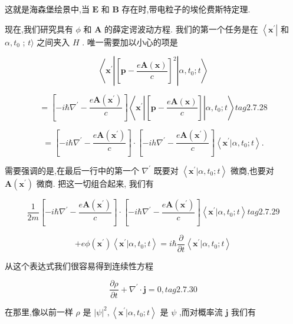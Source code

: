 \documentclass[lang=cn,newtx,10pt,scheme=chinese,thmcnt=section]{elegantbook}
\begin{document}
这就是海森堡绘景中,当 $\mathbf{E}$ 和 $\mathbf{B}$ 存在时,带电粒子的埃伦费斯特定理.

现在,我们研究具有 $\phi$ 和 $\mathbf{A}$ 的薛定谔波动方程. 我们的第一个任务是在 $\left\langle {\mathbf{x}}^{\prime }\right|$ 和 $\alpha ,{t}_{0}$ ; $t\rangle$ 之间夹入 $H$ . 唯一需要加以小心的项是

$$
\left\langle {{\mathbf{x}}^{\prime }\left| {\left\lbrack \mathbf{p} - \frac{e\mathbf{A}\left( \mathbf{x}\right) }{c}\right\rbrack }^{2}\right| \alpha ,{t}_{0};t}\right\rangle
$$

$$
= \left\lbrack {-i\hbar {\nabla }^{\prime } - \frac{e\mathbf{A}\left( {\mathbf{x}}^{\prime }\right) }{c}}\right\rbrack \left\langle {{\mathbf{x}}^{\prime }\left| \left\lbrack {\mathbf{p} - \frac{e\mathbf{A}\left( \mathbf{x}\right) }{c}}\right\rbrack \right| \alpha ,{t}_{0};t}\right\rangle tag{2. 7.28}
$$

$$
= \left\lbrack {-i\hbar {\nabla }^{\prime } - \frac{e\mathbf{A}\left( {\mathbf{x}}^{\prime }\right) }{c}}\right\rbrack \cdot \left\lbrack {-{ih}{\nabla }^{\prime } - \frac{e\mathbf{A}\left( {\mathbf{x}}^{\prime }\right) }{c}}\right\rbrack \left\langle {{\mathbf{x}}^{\prime } | \alpha ,{t}_{0};t}\right\rangle .
$$

需要强调的是,在最后一行中的第一个 ${\nabla }^{\prime }$ 既要对 $\left\langle {{\mathbf{x}}^{\prime } | \alpha ,{t}_{0};t}\right\rangle$ 微商,也要对 $\mathbf{A}\left( {\mathbf{x}}^{\prime }\right)$ 微商. 把这一切组合起来, 我们有

$$
\frac{1}{2m}\left\lbrack {-i\hbar {\nabla }^{\prime } - \frac{e\mathbf{A}\left( {\mathbf{x}}^{\prime }\right) }{c}}\right\rbrack \cdot \left\lbrack {-i\hbar {\nabla }^{\prime } - \frac{e\mathbf{A}\left( {\mathbf{x}}^{\prime }\right) }{c}}\right\rbrack \left\langle {{\mathbf{x}}^{\prime } | \alpha ,{t}_{0};t}\right\rangle tag{2.7.29}
$$

$$
+ {e\phi }\left( {\mathbf{x}}^{\prime }\right) \left\langle {{\mathbf{x}}^{\prime } | \alpha ,{t}_{0};t}\right\rangle = i\hbar \frac{\partial }{\partial t}\left\langle {{\mathbf{x}}^{\prime } | \alpha ,{t}_{0};t}\right\rangle
$$

从这个表达式我们很容易得到连续性方程

$$
\frac{\partial \rho }{\partial t} + {\nabla }^{\prime } \cdot \mathbf{j} = 0, tag{2. 7.30}
$$

在那里,像以前一样 $\rho$ 是 ${\left| \psi \right| }^{2},\left\langle {{\mathbf{x}}^{\prime } | \alpha ,{t}_{0};t}\right\rangle$ 是 $\psi$ ,而对概率流 $\mathbf{j}$ 我们有
\end{document}
